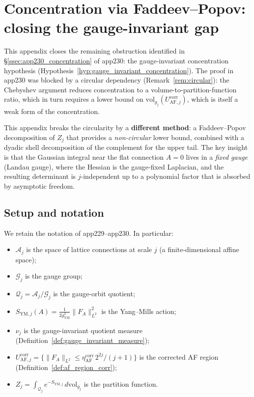 \section{Concentration via Faddeev--Popov: closing the gauge-invariant
gap}
\label{app:concentration_faddeev_popov}

This appendix closes the remaining obstruction identified in
\S\ref{ssec:app230_concentration} of app230: the gauge-invariant
concentration hypothesis (Hypothesis~\ref{hyp:gauge_invariant_concentration}).
The proof in app230 was blocked by a circular dependency
(Remark~\ref{rem:circular}): the Chebyshev argument reduces
concentration to a volume-to-partition-function ratio, which in turn
requires a lower bound on $\mathrm{vol}_{g_{j}}(U_{\mathrm{AF},j}^{
\mathrm{corr}})$, which is itself a weak form of the concentration.

This appendix breaks the circularity by a \textbf{different method}:
a Faddeev--Popov decomposition of $Z_{j}$ that provides a
\emph{non-circular} lower bound, combined with a dyadic shell
decomposition of the complement for the upper tail. The key insight
is that the Gaussian integral near the flat connection $A=0$ lives in
a \emph{fixed gauge} (Landau gauge), where the Hessian is the
gauge-fixed Laplacian, and the resulting determinant is $j$-independent
up to a polynomial factor that is absorbed by asymptotic freedom.

\subsection{Setup and notation}
\label{ssec:app231_setup}

We retain the notation of app229--app230. In particular:
\begin{itemize}
\item $\mathcal{A}_{j}$ is the space of lattice connections at scale
$j$ (a finite-dimensional affine space);
\item $\mathcal{G}_{j}$ is the gauge group;
\item $\mathcal{Q}_{j}=\mathcal{A}_{j}/\mathcal{G}_{j}$ is the
gauge-orbit quotient;
\item $S_{\mathrm{YM},j}(A)=\tfrac{1}{2g_{\mathrm{YM}}^{2}}\|F_{A}\|
_{L^{2}}^{2}$ is the Yang--Mills action;
\item $\nu_{j}$ is the gauge-invariant quotient measure
(Definition~\ref{def:gauge_invariant_measure});
\item $U_{\mathrm{AF},j}^{\mathrm{corr}}=\{\|F_{A}\|_{L^{2}}\le
\eta_{\mathrm{AF}}^{\mathrm{corr}}\,2^{2j}/(j+1)\}$ is the corrected
AF region (Definition~\ref{def:af_region_corr});
\item $Z_{j}=\int_{\mathcal{Q}_{j}}e^{-S_{\mathrm{YM},j}}\,
d\mathrm{vol}_{g_{j}}$ is the partition function.
\end{itemize}

